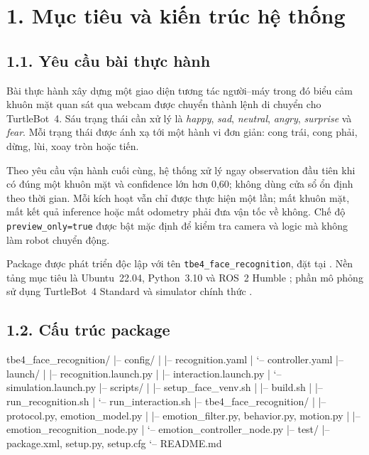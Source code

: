 \section*{1. Mục tiêu và kiến trúc hệ thống}

\subsection*{1.1. Yêu cầu bài thực hành}

Bài thực hành xây dựng một giao diện tương tác người--máy trong đó biểu cảm
khuôn mặt quan sát qua webcam được chuyển thành lệnh di chuyển cho
TurtleBot~4. Sáu trạng thái cần xử lý là \textit{happy}, \textit{sad},
\textit{neutral}, \textit{angry}, \textit{surprise} và \textit{fear}. Mỗi
trạng thái được ánh xạ tới một hành vi đơn giản: cong trái, cong phải, dừng,
lùi, xoay tròn hoặc tiến.

Theo yêu cầu vận hành cuối cùng, hệ thống xử lý ngay observation đầu tiên khi
có đúng một khuôn mặt và confidence lớn hơn 0,60; không dùng cửa sổ ổn định
theo thời gian. Mỗi kích hoạt vẫn chỉ được thực hiện một lần; mất khuôn mặt,
mất kết quả inference hoặc mất odometry phải đưa vận tốc về không. Chế độ
\texttt{preview\_only=true} được bật mặc định để kiểm tra camera và logic mà
không làm robot chuyển động.

Package được phát triển độc lập với tên \texttt{tbe4\_face\_recognition}, đặt
tại . Nền tảng mục tiêu là
Ubuntu~22.04, Python~3.10 và ROS~2 Humble \cite{ros2humble}; phần mô phỏng sử
dụng TurtleBot~4 Standard và simulator chính thức \cite{turtlebot4}.

\subsection*{1.2. Cấu trúc package}

\begin{svcode}
tbe4_face_recognition/
|-- config/
|   |-- recognition.yaml
|   `-- controller.yaml
|-- launch/
|   |-- recognition.launch.py
|   |-- interaction.launch.py
|   `-- simulation.launch.py
|-- scripts/
|   |-- setup_face_venv.sh
|   |-- build.sh
|   |-- run_recognition.sh
|   `-- run_interaction.sh
|-- tbe4_face_recognition/
|   |-- protocol.py, emotion_model.py
|   |-- emotion_filter.py, behavior.py, motion.py
|   |-- emotion_recognition_node.py
|   `-- emotion_controller_node.py
|-- test/
|-- package.xml, setup.py, setup.cfg
`-- README.md
\end{svcode}


